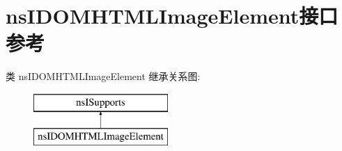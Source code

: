 \hypertarget{interfacens_i_d_o_m_h_t_m_l_image_element}{}\section{ns\+I\+D\+O\+M\+H\+T\+M\+L\+Image\+Element接口 参考}
\label{interfacens_i_d_o_m_h_t_m_l_image_element}
类 ns\+I\+D\+O\+M\+H\+T\+M\+L\+Image\+Element 继承关系图\+:\begin{figure}[H]
\begin{center}
\leavevmode
\includegraphics[height=2.000000cm]{interfacens_i_d_o_m_h_t_m_l_image_element}
\end{center}
\end{figure}
